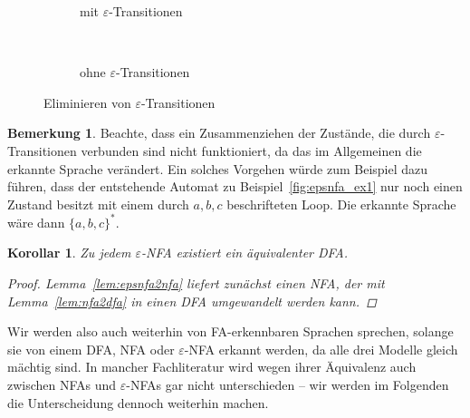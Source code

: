 \documentclass[11pt, a4paper]{article}
\theoremstyle{definition}
\newtheorem*{remark*}{Bemerkung}
\theoremstyle{plain}
\newtheorem{corollary}[definition]{Korollar}
\numberwithin{equation}{section}
\begin{document}
\begin{figure}
	\centering
	\begin{subfigure}[b]{.49\textwidth}
		\centering
		
		\caption{mit $\varepsilon$-Transitionen}
		\label{fig:epsnfa_ex2_eps}
	\end{subfigure}~
	\begin{subfigure}[b]{.49\textwidth}
		\centering
		
		\caption{ohne $\varepsilon$-Transitionen}
		\label{fig:epsnfa_ex2_noeps}
	\end{subfigure}
	\caption{Eliminieren von $\varepsilon$-Transitionen}
	\label{fig:epsnfa_ex2}
\end{figure}
\begin{remark*}
	Beachte, dass ein Zusammenziehen der Zustände, die durch $\varepsilon$-Transitionen verbunden sind nicht funktioniert, da das im Allgemeinen die erkannte Sprache verändert. Ein solches Vorgehen würde zum Beispiel dazu führen, dass der entstehende Automat zu Beispiel~\ref{fig:epsnfa_ex1} nur noch einen Zustand besitzt mit einem durch $a, b, c$ beschrifteten Loop. Die erkannte Sprache wäre dann $\{a, b, c\}^\ast$.
\end{remark*}
\begin{corollary}
	Zu jedem $\varepsilon$-NFA existiert ein äquivalenter DFA.
	\begin{proof}
		Lemma~\ref{lem:epsnfa2nfa} liefert zunächst einen NFA, der mit Lemma~\ref{lem:nfa2dfa} in einen DFA umgewandelt werden kann.
	\end{proof}
\end{corollary}
Wir werden also auch weiterhin von FA-erkennbaren Sprachen sprechen, solange sie von einem DFA, NFA oder $\varepsilon$-NFA erkannt werden, da alle drei Modelle gleich mächtig sind. In mancher Fachliteratur wird wegen ihrer Äqui\-va\-lenz auch zwischen NFAs und $\varepsilon$-NFAs gar nicht unterschieden -- wir werden im Folgenden die Unterscheidung dennoch weiterhin machen.
\end{document}
